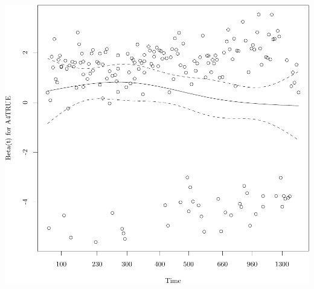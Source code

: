 \documentclass{article}\usepackage[]{graphicx}\usepackage[]{color}
\makeatletter
\def\maxwidth{ %
  \ifdim\Gin@nat@width>\linewidth
    \linewidth
  \else
    \Gin@nat@width
  \fi
}
\newenvironment{knitrout}{}{} %
\makeatother
\begin{document}
\begin{knitrout}
{}




{\centering \includegraphics[width=\maxwidth]{figure/05-eda-ph-check-full-8} 

}



\end{knitrout}
\end{document}
